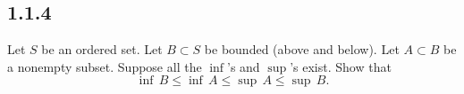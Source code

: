 \documentclass{article}
\begin{document}
\subsection{1.1.4}
Let $S$ be an ordered set.  Let $B \subset S$ be bounded (above and
below).  Let $A \subset B$ be a nonempty subset.
Suppose all the $\inf$'s and
$\sup$'s exist. Show that
\begin{equation*}
\inf\, B \leq \inf\, A \leq \sup\, A \leq \sup\, B .
\end{equation*}
\iftoggle{showsolutions}{\begin{solution} 

\end{solution}}{}
\end{document}
